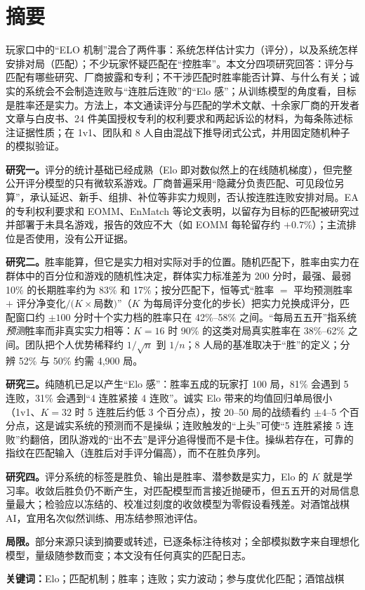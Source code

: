 \chapter*{摘要}

{\small
玩家口中的“ELO 机制”混合了两件事：系统怎样估计实力（评分），以及系统怎样安排对局（匹配）；不少玩家怀疑匹配在“控胜率”。本文分四项研究回答：评分与匹配有哪些研究、厂商披露和专利；不干涉匹配时胜率能否计算、与什么有关；诚实的系统会不会制造连败与“连胜后连败”的“Elo 感”；从训练模型的角度看，目标是胜率还是实力。方法上，本文通读评分与匹配的学术文献、十余家厂商的开发者文章与白皮书、24 件美国授权专利的权利要求和两起诉讼的材料，为每条陈述标注证据性质；在 1v1、团队和 8 人自由混战下推导闭式公式，并用固定随机种子的模拟验证。

\textbf{研究一。}评分的统计基础已经成熟（Elo 即对数似然上的在线随机梯度），但完整公开评分模型的只有微软系游戏。厂商普遍采用“隐藏分负责匹配、可见段位另算”，承认延迟、新手、组排、补位等非实力规则，否认按连胜连败安排对局。EA 的专利权利要求和 EOMM、EnMatch 等论文表明，以留存为目标的匹配被研究过并部署于未具名游戏，报告的效应不大（如 EOMM 每轮留存约 $+0.7\%$）；主流排位是否使用，没有公开证据。

\textbf{研究二。}胜率能算，但它是实力相对实际对手的位置。随机匹配下，胜率由实力在群体中的百分位和游戏的随机性决定，群体实力标准差为 200 分时，最强、最弱 10\% 的长期胜率约为 83\% 和 17\%；按分匹配下，恒等式“胜率 $=$ 平均预测胜率 $+$ 评分净变化$/(K\times$局数$)$”（$K$ 为每局评分变化的步长）把实力兑换成评分，匹配窗口约 $\pm100$ 分时十个实力档的胜率只在 42\%–58\% 之间。“每局五五开”指系统\emph{预测}胜率而非真实实力相等：$K=16$ 时 90\% 的这类对局真实胜率在 38\%–62\% 之间。团队把个人优势稀释约 $1/\sqrt n$ 到 $1/n$；8 人局的基准取决于“胜”的定义；分辨 52\% 与 50\% 约需 4,900 局。

\textbf{研究三。}纯随机已足以产生“Elo 感”：胜率五成的玩家打 100 局，81\% 会遇到 5 连败，31\% 会遇到“4 连胜紧接 4 连败”。诚实 Elo 带来的均值回归单局很小（1v1、$K=32$ 时 5 连胜后约低 3 个百分点），按 20–50 局的战绩看约 $\pm4$–5 个百分点，这是诚实系统的预测而不是操纵；连败触发的“上头”可使“5 连胜紧接 5 连败”约翻倍，团队游戏的“出不去”是评分追得慢而不是卡住。操纵若存在，可靠的指纹在匹配输入（连胜后对手评分偏高），而不在胜负序列。

\textbf{研究四。}评分系统的标签是胜负、输出是胜率、潜参数是实力，Elo 的 $K$ 就是学习率。收敛后胜负仍不断产生，对匹配模型而言接近抛硬币，但五五开的对局信息量最大；检验应以冻结的、校准过刻度的收敛模型为零假设看残差。对酒馆战棋 AI，宜用名次似然训练、用冻结参照池评估。

\textbf{局限。}部分来源只读到摘要或转述，已逐条标注待核对；全部模拟数字来自理想化模型，量级随参数而变；本文没有任何真实的匹配日志。

\textbf{关键词：}Elo；匹配机制；胜率；连败；实力波动；参与度优化匹配；酒馆战棋
\par}
